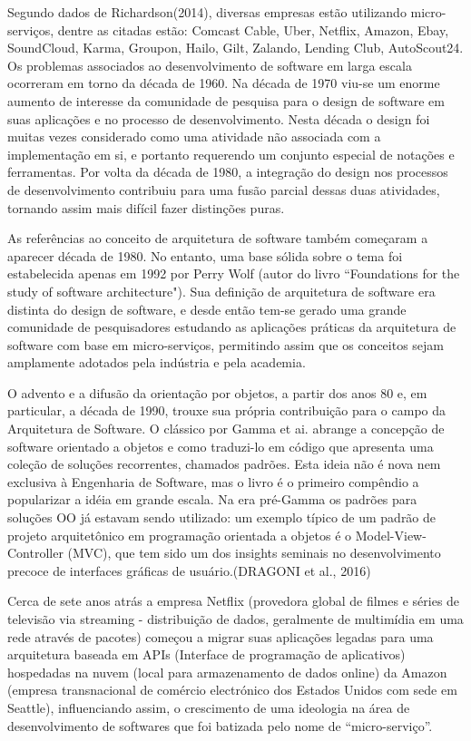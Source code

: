 Segundo dados de Richardson(2014), diversas empresas estão utilizando micro-serviços, dentre as citadas estão: Comcast Cable, Uber, Netflix, Amazon, Ebay, SoundCloud, Karma, Groupon, Hailo, Gilt, Zalando, Lending Club, AutoScout24.
Os problemas associados ao desenvolvimento de software em larga escala ocorreram em torno da década de 1960. Na década de 1970 viu-se um enorme aumento de interesse da comunidade de pesquisa para o design de software em suas aplicações e  no processo de desenvolvimento. Nesta década o design foi muitas vezes considerado como uma atividade não associada com a implementação em si, e portanto requerendo um conjunto especial de notações e ferramentas. Por volta da década de 1980, a integração do design nos processos de desenvolvimento contribuiu para uma fusão parcial dessas duas atividades, tornando assim mais difícil fazer distinções puras.

As referências ao conceito de arquitetura de software também começaram a aparecer década de 1980. No entanto, uma base sólida sobre o tema foi estabelecida apenas em 1992 por Perry Wolf (autor do livro “Foundations for the study of software architecture"). Sua definição de arquitetura de software era distinta do design de software, e desde então tem-se gerado uma grande comunidade de pesquisadores estudando as aplicações práticas da arquitetura de software com base em micro-serviços, permitindo  assim que os conceitos sejam amplamente adotados pela indústria e pela academia.

O advento e a difusão da orientação por objetos, a partir dos anos 80 e, em particular, a década de 1990, trouxe sua própria contribuição para o campo da Arquitetura de Software. O clássico por Gamma et ai. abrange a concepção de software orientado a objetos e como traduzi-lo em código que apresenta uma coleção de soluções recorrentes, chamados padrões. Esta ideia não é nova nem exclusiva à Engenharia de Software, mas o livro é o primeiro compêndio a popularizar a idéia em grande escala. Na era pré-Gamma os padrões para soluções OO já estavam sendo utilizado: um exemplo típico de um padrão de projeto arquitetônico em programação orientada a objetos é o Model-View-Controller (MVC), que tem sido um dos insights seminais no desenvolvimento precoce de interfaces gráficas de usuário.(DRAGONI et al., 2016)

Cerca de sete anos atrás a empresa Netflix (provedora global de filmes e séries de televisão via streaming - distribuição de dados, geralmente de multimídia em uma rede através de pacotes) começou a migrar suas aplicações legadas para uma arquitetura baseada em APIs (Interface de programação de aplicativos) hospedadas na nuvem (local para armazenamento de dados online) da Amazon (empresa transnacional de comércio electrónico dos Estados Unidos com sede em Seattle), influenciando assim, o crescimento de uma ideologia na área de desenvolvimento de softwares que foi batizada pelo nome de “micro-serviço”.

